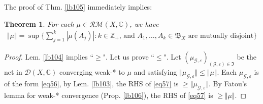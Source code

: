 \documentclass[12pt,b5paper,notitlepage]{article}
\theoremstyle{definition}
\theoremstyle{plain}
\newtheorem{thm}[df]{Theorem}
\newcommand{\fk}{\mathfrak}
\newcommand{\Cbb}{\mathbb C}
\newcommand{\Zbb}{\mathbb Z}
\newcommand{\Rbb}{\mathbb R}
\newcommand{\eps}{\varepsilon}
\newcommand{\MG}{\mathcal G}
\newcommand{\MD}{\mathcal D}
\newcommand{\RM}{\mathcal {RM}}
\numberwithin{equation}{section}
\begin{document}
The proof of Thm. \ref{lb105} immediately implies:


\begin{thm}
For each $\mu\in\RM(X,\Cbb)$, we have
\begin{align}\label{eq57}
\Vert\mu\Vert=\sup\Big\{\sum_{j=1}^k|\mu(A_j)|:k\in\Zbb_+\text{, and $A_1,\dots,A_k\in\fk B_X$ are mutually disjoint}\Big\}
\end{align}
\end{thm}

\begin{proof}
Lem. \ref{lb104} implies ``$\geq$". Let us prove ``$\leq$". Let $(\mu_{\MG,\eps})_{(\MG,\eps)\in\fk I}$ be the net in $\MD(X,\Cbb)$ converging weak-* to $\mu$ and satisfying $\Vert\mu_{\MG,\eps}\Vert\leq\Vert\mu\Vert$. Each $\mu_{\MG,\eps}$ is of the form \eqref{eq56}, by Lem. \ref{lb103}, the RHS of \eqref{eq57} is $\geq\Vert\mu_{\MG,\eps}\Vert$. By Fatou's lemma for weak-* convergence (Prop. \ref{lb106}), the RHS of \eqref{eq57} is $\geq\Vert\mu\Vert$.
\end{proof}


\begin{comment}
In Subsec. \ref{lb107}, we noted that characterizing the dual space $V^*$ is equivalent to establishing the equivalence between the first and second columns of Table \ref{tb1}---that is, between pointwise convergence of functions and convergence of moments---once Principle \ref{lb23} is in place.

Now, let $I\subset\Rbb$ be a proper interval, and suppose our goal is to classify the positive linear functionals on $C(I)$, i.e., to prove the Riesz Representation Thm. \ref{lb9}. The equivalence of the first and second columns of Table \ref{tb1} is established in Thm. \ref{lb92} and Cor. \ref{lb95}. If we can prove Principle \ref{lb23}, which asserts in the current setting that any positive linear functional on $C(I)$ can be weak-* approximated by elementary functions (i.e., linear combinations of Dirac measures; see Table \ref{lb3}), then Thm. \ref{lb9} follows as a consequence.

Of course, Thm. \ref{lb105} shows that Principle \ref{lb23} can be deduced if the Riesz Representation Thm. \ref{lb9} is already known. However, by slightly modifying the argument in the proof of Thm. \ref{lb105}, one can prove Principle \ref{lb23} without assuming Thm. \ref{lb9} in advance:
\end{comment}


\newpage
\end{document}
